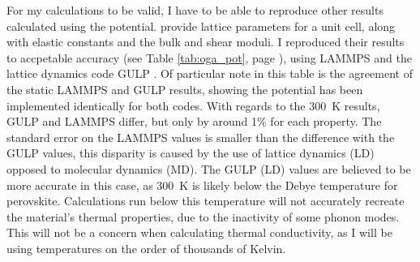 For my calculations to be valid, I have to be able to reproduce other results calculated using the \citet{Oganov2000} potential. \citeauthor{Oganov2000} provide lattice parameters for a unit cell, along with elastic constants and the bulk and shear moduli. I reproduced their results to accpetable accuracy (see Table \ref{tab:oga_pot}, page \pageref{tab:oga_pot}), using LAMMPS and the lattice dynamics code GULP \citep{Gale1997}. Of particular note in this table is the agreement of the static LAMMPS and GULP results, showing the potential has been implemented identically for both codes. With regards to the 300~K results, GULP and LAMMPS differ, but only by around 1\% for each property. The standard error on the LAMMPS values is smaller than the difference with the GULP values, this disparity is caused by the use of lattice dynamics (LD) opposed to molecular dynamics (MD). The GULP (LD) values are believed to be more accurate in this case, 
as 300~K is likely below the Debye temperature for perovskite. Calculations run below this temperature will not accurately recreate the material's thermal properties, due to the inactivity of some phonon modes. This will not be a concern when calculating thermal conductivity, as I will be using temperatures on the order of thousands of Kelvin.

